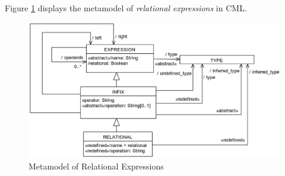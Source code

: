 Figure \ref{fig:meta:relational-expr} displays the metamodel of
\emph{relational expressions} in CML.

\begin{figure}[H]
\centering
\includegraphics[width=1.2\textwidth]{metamodel/relational-expr}
\caption{Metamodel of Relational Expressions}
\label{fig:meta:relational-expr}
\end{figure}

